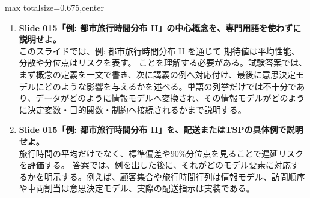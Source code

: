 \begin{adjustbox}{max totalsize={\textwidth}{0.675\textheight},center}
\begin{minipage}{\textwidth}
\begin{minipage}[t]{0.485\textwidth}
\begin{enumerate}
\item \textbf{Slide 015「例: 都市旅行時間分布 II」の中心概念を、専門用語を使わずに説明せよ。}\\このスライドでは、例: 都市旅行時間分布 II を通じて 期待値は平均性能、分散や分位点はリスクを表す。 ことを理解する必要がある。試験答案では、まず概念の定義を一文で書き、次に講義の例へ対応付け、最後に意思決定モデルにどのような影響を与えるかを述べる。単語の列挙だけでは不十分であり、データがどのように情報モデルへ変換され、その情報モデルがどのように決定変数・目的関数・制約へ接続されるかまで説明する。
\item \textbf{Slide 015「例: 都市旅行時間分布 II」を、配送またはTSPの具体例で説明せよ。}\\旅行時間の平均だけでなく、標準偏差や90\%分位点を見ることで遅延リスクを評価する。 答案では、例を出した後に、それがどのモデル要素に対応するかを明示する。例えば、顧客集合や旅行時間行列は情報モデル、訪問順序や車両割当は意思決定モデル、実際の配送指示は実装である。
\end{enumerate}
\end{minipage}
\end{minipage}
\end{adjustbox}

